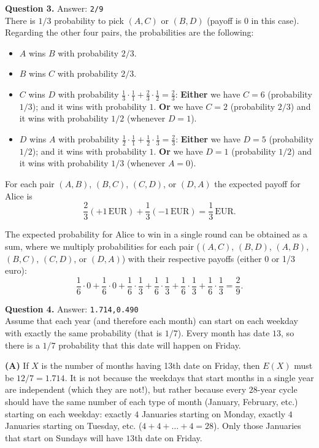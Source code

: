 \documentclass[jou]{apa6}
\begin{document}
\vspace{10pt}
{\bf Question 3.} Answer: {\tt 2/9}\\
There is $1/3$ probability to pick $(A,C)$ or $(B,D)$ (payoff is $0$ in this case).\\
Regarding the other four pairs, the probabilities are the following:
\begin{itemize}
\item $A$ wins $B$ with probability $2/3$.
\item $B$ wins $C$ with probability $2/3$.
\item $C$ wins $D$ with probability $\frac{1}{3} \cdot \frac{1}{1} + \frac{2}{3} \cdot \frac{1}{2}=\frac{2}{3}$:
{\bf Either} we have $C=6$ (probability $1/3$); and it wins with probability $1$. {\bf Or} we have $C=2$ (probability $2/3$) 
and it wins with probability $1/2$ (whenever $D=1$).
\item $D$ wins $A$ with probability $\frac{1}{2} \cdot \frac{1}{1} + \frac{1}{2} \cdot \frac{1}{3}=\frac{2}{3}$:
{\bf Either} we have $D=5$ (probability $1/2$); and it wins with probability $1$. {\bf Or} we have $D=1$ (probability $1/2$) 
and it wins with probability $1/3$ (whenever $A=0$).
\end{itemize}

For each pair $(A,B)$, $(B,C)$, $(C,D)$, or $(D,A)$ the expected payoff for Alice is
$$\frac{2}{3}(+1\,\text{EUR}) + \frac{1}{3}(-1\,\text{EUR}) = \frac{1}{3}\,\text{EUR}.$$

The expected probability for Alice to win in a single round can be obtained 
as a sum, where we multiply probabilities for each pair  
($(A,C)$, $(B,D)$, $(A,B)$, $(B,C)$, $(C,D)$, or $(D,A)$) with their respective payoffs (either 0 or 1/3 euro):
$$\frac{1}{6} \cdot 0 + \frac{1}{6} \cdot 0 + \frac{1}{6} \cdot \frac{1}{3}
+ \frac{1}{6} \cdot \frac{1}{3} + \frac{1}{6} \cdot \frac{1}{3} + \frac{1}{6} \cdot \frac{1}{3} = \frac{2}{9}.$$


\vspace{10pt}
{\bf Question 4.} Answer: {\tt 1.714,0.490}\\
Assume that each year (and therefore each month) can start on 
each weekday with exactly the same probability (that is $1/7$). 
Every month has date $13$, so there is a $1/7$ probability that 
this date will happen on Friday. 

{\bf (A)} If $X$ is the number of months having 13th date on Friday, 
then $E(X)$ must be $12/7 = 1.714$. It is not because the
weekdays that start months in a single year are independent (which they are not!), 
but rather because every $28$-year cycle 
should have the same number of each type of month (January, February, etc.) 
starting on each weekday: exactly $4$ Januaries starting on Monday, 
exactly $4$ Januaries starting on Tuesday, etc. ($4+4+\ldots+4 = 28$).
Only those Januaries that start on Sundays will have $13$th date on Friday. 
\end{document}
